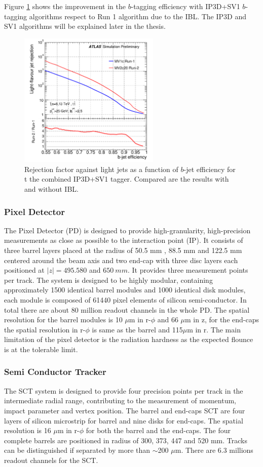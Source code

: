 Figure \ref{fig:chap2:ATLAS:ITK:IBL:Btag} shows the improvement in the $b$-tagging efficiency with IP3D+SV1 $b$-tagging algorithms respect to Run 1 algorithm due to the IBL. The IP3D and SV1 algorithms will be explained later in the thesis.
\begin{figure}[H]
    \centering
    \includegraphics[width=0.6\textwidth]{Ch2/Img/IBL_btag2.png}
    \caption{Rejection factor against light jets as a function of $b$-jet efficiency for t the combined IP3D+SV1 tagger. Compared are the results with and without IBL.}
    \label{fig:chap2:ATLAS:ITK:IBL:Btag}
\end{figure}
\subsubsection{Pixel Detector}
\label{chap2:ATLAS:ITK:PD}
The Pixel Detector (PD) is designed to provide high-granularity, high-precision measurements as close as possible to the interaction point (IP). It consists of three barrel layers placed at the radius of 50.5 mm , 88.5 mm and 122.5 mm centered around the beam axis and two end-cap with three disc layers each positioned at $|z|= 495.580$ and $650 \ mm$. It provides three measurement points per track. The system is designed to be highly modular, containing approximately 1500 identical barrel modules and 1000 identical disk modules, each module is composed of 61440 pixel elements of silicon semi-conductor. In total there are about 80 million readout channels in the whole PD. The spatial resolution for the barrel modules is 10 $\mu$m in r-$\phi$ and 66 $\mu$m in z, for the end-caps the spatial resolution in r-$\phi$ is same as the barrel and 115$\mu$m in r. The main limitation of the pixel detector is the radiation hardness as the expected flounce is at the tolerable limit. 
\subsubsection{Semi Conductor Tracker}
\label{chap2:ATLAS:ITK:SCT}
The SCT system is designed to provide four precision points per track in the intermediate radial range, contributing to the measurement of momentum, impact parameter and vertex position. The barrel and end-caps SCT are four layers of silicon microstrip for barrel and nine disks for end-caps. The spatial resolution is 16 $\mu$m in r-$\phi$ for both the barrel and the end-caps. The four complete barrels are positioned in radius of 300, 373, 447 and 520 mm. Tracks can be distinguished if separated by more than $\sim$200 $\mu$m. There are 6.3 millions readout channels for the SCT.
